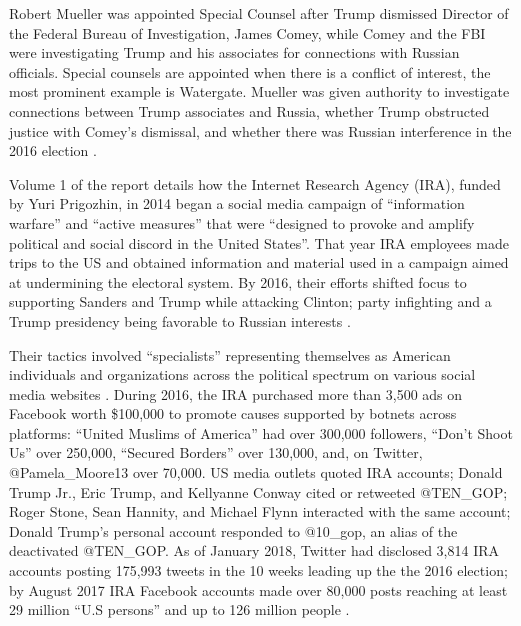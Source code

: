 Robert Mueller was appointed Special Counsel after Trump dismissed Director of the Federal Bureau of Investigation, James Comey, while Comey and the FBI were investigating Trump and his associates for connections with Russian officials.
Special counsels are appointed when there is a conflict of interest, the most prominent example is Watergate.
Mueller was given authority to investigate connections between Trump associates and Russia, whether Trump obstructed justice with Comey's dismissal, and whether there was Russian interference in the 2016 election \cite[p.11]{mueller}.

Volume 1 of the report details how the Internet Research Agency (IRA), funded by Yuri Prigozhin, in 2014 began a social media campaign of ``information warfare'' and ``active measures'' that were ``designed to provoke and amplify political and social discord in the United States''.
That year IRA employees made trips to the US and obtained information and material used in a campaign aimed at undermining the electoral system.
By 2016, their efforts shifted focus to supporting Sanders and Trump while attacking Clinton; party infighting and a Trump presidency being favorable to Russian interests \cite[p. 14]{mueller}.

Their tactics involved ``specialists'' representing themselves as American individuals and organizations across the political spectrum on various social media websites \cite[p.22]{mueller}.
During 2016, the IRA purchased more than 3,500 ads on Facebook worth \$100,000 to promote causes supported by botnets across platforms: ``United Muslims of America'' had over 300,000 followers, ``{Don't Shoot Us}'' over 250,000, ``Secured Borders'' over 130,000, and, on Twitter, @Pamela\_Moore13 over 70,000. 
US media outlets quoted IRA accounts; Donald Trump Jr., Eric Trump, and Kellyanne Conway cited or retweeted @TEN\_GOP; Roger Stone, Sean Hannity, and Michael Flynn interacted with the same account; Donald Trump's personal account responded to @10\_gop, an alias of the deactivated @TEN\_GOP. 
As of January 2018, Twitter had disclosed 3,814 IRA accounts posting 175,993 tweets in the 10 weeks leading up the the 2016 election; by August 2017 IRA Facebook accounts made over 80,000 posts reaching at least 29 million ``U.S persons'' and up to 126 million people \cite[pp. 26-28]{mueller}.


